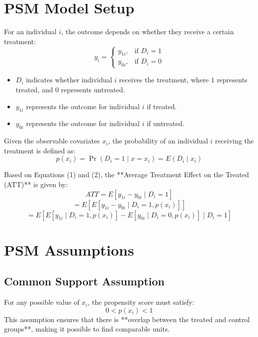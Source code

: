 \documentclass[10pt, oneside]{article}
\begin{document}
\section{PSM Model Setup}

For an individual $i$, the outcome depends on whether they receive a certain treatment:
\begin{equation}
y_i =
\begin{cases}
y_{1i}, & \text{if } D_i = 1 \\
y_{0i}, & \text{if } D_i = 0
\end{cases}
\end{equation}

\begin{itemize}
    \item $D_i$ indicates whether individual $i$ receives the treatment, where $1$ represents treated, and $0$ represents untreated.
    \item $y_{1i}$ represents the outcome for individual $i$ if treated.
    \item $y_{0i}$ represents the outcome for individual $i$ if untreated.
\end{itemize}

Given the observable covariates $x_i$, the probability of an individual $i$ receiving the treatment is defined as:
\begin{equation}
p(x_i) = \Pr(D_i = 1 \mid x = x_i) = E(D_i \mid x_i)
\end{equation}

Based on Equations (1) and (2), the **Average Treatment Effect on the Treated (ATT)** is given by:
\begin{equation}
ATT = E[y_{1i} - y_{0i} \mid D_i = 1]
\end{equation}
\begin{equation}
= E[E[y_{1i} - y_{0i} \mid D_i = 1, p(x_i)]]
\end{equation}
\begin{equation}
= E[E[y_{1i} \mid D_i = 1, p(x_i)] - E[y_{0i} \mid D_i = 0, p(x_i)] \mid D_i = 1]
\end{equation}

\section{PSM Assumptions}

\subsection{Common Support Assumption}
For any possible value of $x_i$, the propensity score must satisfy:
\begin{equation}
0 < p(x_i) < 1
\end{equation}
This assumption ensures that there is **overlap between the treated and control groups**, making it possible to find comparable units.
\end{document}
